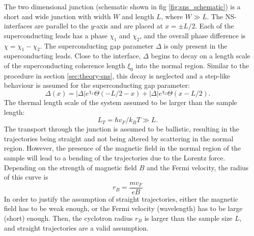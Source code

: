 The two dimensional junction (schematic shown in fig \ref{fig:sns_schematic}) is a short and wide junction with width $W$ and length $L$, where $W \gg L$. The NS-interfaces are parallel to the $y$-axis and are placed at $x = \pm L/2$. Each of the superconducting leads has a phase $\chi_{1}$ and $\chi_{2}$, and the overall phase difference is $\chi = \chi_{1} - \chi_{2}$. The superconducting gap parameter $\Delta$ is only present in the superconducting leads. Close to the interface, $\Delta$ begins to decay on a length scale of the superconducting coherence length $\xi_0$ into the normal region.
Similar to the procedure in section \ref{sec:theory-sns}, this decay is neglected and a step-like behaviour is assumed for the superconducting gap parameter:
\begin{equation}
\Delta\left( x \right) = |\Delta| e^{\chi_1} \Theta\left(-L/2 -x \right) + |\Delta| e^{\chi_2} \Theta\left(x-L/2 \right).
\label{eq:gap_parameter}
\end{equation}
The thermal length scale of the system assumed to be larger than the sample length:
\begin{equation}
L_T = \hbar v_F / k_B T \gg L.
\end{equation}
The transport through the junction is assumed to be ballistic, resulting in the trajectories being straight and not being altered by scattering in the normal region. However, the presence of the magnetic field in the normal region of the sample will lead to a bending of the trajectories due to the Lorentz force. Depending on the strength of magnetic field $B$ and the Fermi velocity, the radius of this curve is 
\begin{equation}
r_B = \frac{m v_F}{e B}
\end{equation}
In order to justify the assumption of straight trajectories, either the magnetic field has to be weak enough, or the Fermi velocity (wavelength) has to be large (short) enough. Then, the cyclotron radius $r_B$ is larger than the sample size $L$, and straight trajectories are a valid assumption. 

